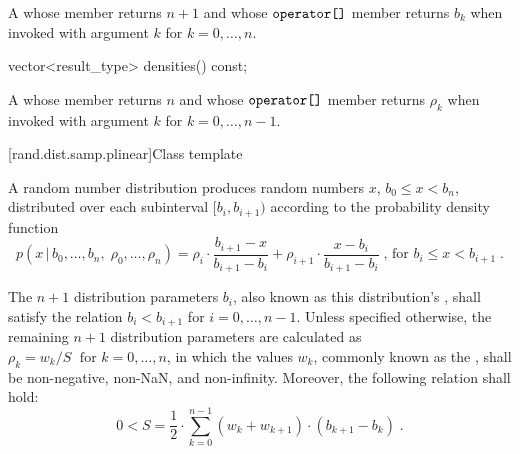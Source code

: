 \begin{itemdescr}
\pnum\returns A 
 whose  member returns $n + 1$
 and whose $ \texttt{operator[]} $ member returns $b_k$
 when invoked with argument $k$ for $k = 0, \ldots, n $.
\end{itemdescr}

%
\begin{itemdecl}
vector<result_type> densities() const;
\end{itemdecl}

\begin{itemdescr}
\pnum\returns A 
 whose  member returns $n$
 and whose $ \texttt{operator[]} $ member returns $\rho_k$
 when invoked with argument $k$ for $k = 0, \ldots, n\!-\!1 $.
\end{itemdescr}



[rand.dist.samp.plinear]{Class template }%
%
%

\pnum
A  random number distribution
produces random numbers $x$,
$ b_0 \leq x < b_n $,
distributed over each subinterval
$ [ b_i, b_{i+1} ) $
according to the probability density function
%
%
\[%
 p(x\,|\,b_0,\ldots,b_n,\;\rho_0,\ldots,\rho_n)
      = \rho_i     \cdot {\frac{b_{i+1} - x}{b_{i+1} - b_i}}
      + \rho_{i+1} \cdot {\frac{x - b_i}{b_{i+1} - b_i}}
\; \mbox{,}
\mbox{ for } b_i \le x < b_{i+1}
\; \mbox{.}
\]

\pnum
The $n+1$ distribution parameters $b_i$,
also known as this distribution's %
%
%
, shall satisfy the relation
 $ b_i < b_{i+1} $
for $i = 0, \ldots, n\!-\!1 $.
Unless specified otherwise,
the remaining $n+1$ distribution parameters are calculated as
$ \rho_k = {w_k / S} \; \mbox{ for } k = 0, \ldots, n $,
in which the values $w_k$,
commonly known as the %
%
%
, shall be non-negative, non-NaN, and non-infinity.
Moreover, the following relation shall hold:
\[%
 0 < S = \frac{1}{2}
       \cdot \sum_{k=0}^{n-1} (w_k + w_{k+1}) \cdot (b_{k+1} - b_k)
\; \mbox{.}
\]

